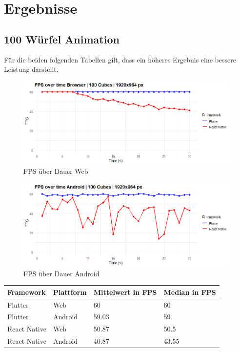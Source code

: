 \newpage
\section{Ergebnisse}
\subsection{100 Würfel Animation}
Für die beiden folgenden Tabellen gilt, dass ein höheres Ergebnis eine bessere Leistung darstellt.
\begin{figure}[H]
    \centering
    \includegraphics[width=1\linewidth]{images/web/100Cubes.png}
    \caption{FPS über Dauer Web}
\end{figure}

\begin{figure}[H]
    \centering
   \includegraphics[width=1\linewidth]{images/android/100Cubes.png}
    \caption{FPS über Dauer Android}
\end{figure}

\begin{table}[h!]
    \centering
    \begin{tabular}{llll}
    \toprule
    \textbf{Framework} & \textbf{Plattform} & \textbf{Mittelwert in FPS} & \textbf{Median in FPS} \\
    \midrule
        Flutter & Web & 60 & 60 \\
        Flutter & Android & 59.03 & 59 \\
        React Native & Web & 50.87 & 50.5 \\
        React Native & Android & 40.87 & 43.55 \\
    \bottomrule
    \end{tabular}
\end{table}

